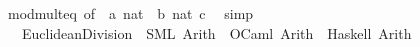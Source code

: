 \begin{isabellebody}
\ mod{\isacharunderscore}{\kern0pt}mult{}{\isacharunderscore}{\kern0pt}eq{\isacharprime}{\kern0pt}\ {\isacharbrackleft}{\kern0pt}of\ {\isacartoucheopen}{\isacharminus}{\kern0pt}\ a{\isacartoucheclose}\ {\isacartoucheopen}nat\ {\isacharparenleft}{\kern0pt}{\isacharminus}{\kern0pt}\ b{\isacharparenright}{\kern0pt}{\isacartoucheclose}\ {\isacartoucheopen}nat\ c{\isacartoucheclose}{\isacharbrackright}{\kern0pt}\ \isamarkupfalse%
\ simp\isanewline
{}\isamarkupfalse%
%
\endisatagproof
{\isafoldproof}%
%
\isadelimproof
%
\endisadelimproof
%
\isadelimdocument
%
\endisadelimdocument
%
\isatagdocument
%
\isamarkuptrue%
%
\endisatagdocument
{\isafolddocument}%
%
\isadelimdocument
%
\endisadelimdocument
{}\isamarkupfalse%
\isanewline
\ \ \ Euclidean{\isacharunderscore}{\kern0pt}Division\ {\isasymrightharpoonup}\ {\isacharparenleft}{\kern0pt}SML{\isacharparenright}{\kern0pt}\ Arith\ \ {\isacharparenleft}{\kern0pt}OCaml{\isacharparenright}{\kern0pt}\ Arith\ \ {\isacharparenleft}{\kern0pt}Haskell{\isacharparenright}{\kern0pt}\ Arith\isanewline
%
\isadelimtheory
\isanewline
%
\endisadelimtheory
%
\isatagtheory
{}\isamarkupfalse%
%
\endisatagtheory
{\isafoldtheory}%
%
\isadelimtheory
%
\endisadelimtheory
%
\end{isabellebody}%
\endinput
